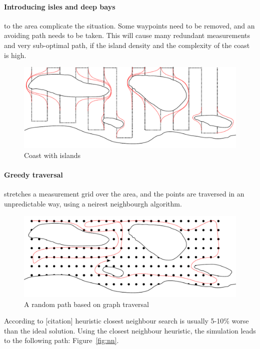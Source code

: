 \paragraph{Introducing isles and deep bays} to the area complicate the situation. Some waypoints need to be removed, and an avoiding path needs to be taken. This will cause many redundant measurements and very sub-optimal path, if the island density and the complexity of the coast is high.

\begin{figure}[H]
	\centering
	\includegraphics[width=\textwidth]{img/pathislands}
	\caption{Coast with islands}
	\label{fig:pathislands}
\end{figure}

\paragraph{Greedy traversal}

stretches a measurement grid over the area, and the points are traversed in an unpredictable way, using a neirest neighbourgh algorithm.

\begin{figure}[H]
	\centering
	\includegraphics[width=\textwidth]{img/traversal}
	\caption{A random path based on graph traversal}
	\label{fig:traversal}
\end{figure}

 According to [citation] heuristic closest neighbour search is usually 5-10\% worse than the ideal solution. Using the closest neighbour heuristic, the simulation leads to the following path: Figure~\ref{fig:nn}.

